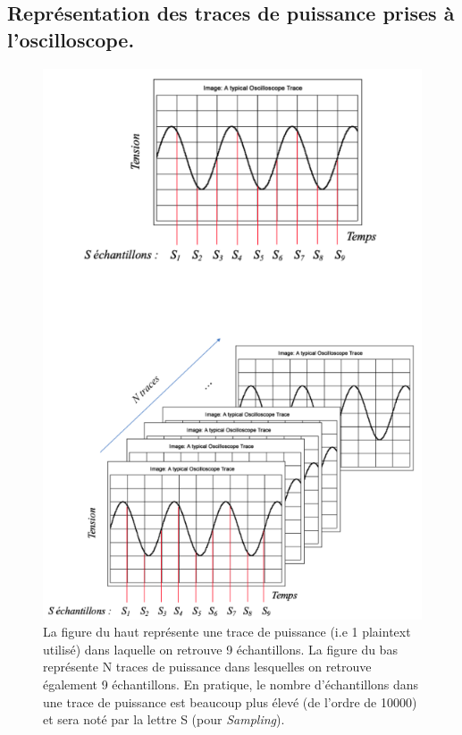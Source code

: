 \documentclass[oneside]{book}
\begin{document}
\begin{appendices}
\newpage

\section{Représentation des traces de puissance prises à l'oscilloscope.}
\label{ann:traceExplain}
\begin{figure}[htbp]
    \centering
    \includegraphics[scale=0.65]{image/Sampling}
    \caption{La figure du haut représente une trace de puissance (i.e 1 plaintext utilisé) dans laquelle on retrouve 9 échantillons. La figure du bas représente N traces de puissance dans lesquelles on retrouve également 9 échantillons. En pratique, le nombre d'échantillons dans une trace de puissance est beaucoup plus élevé (de l'ordre de 10000) et sera noté par la lettre S (pour \textit{Sampling}).}
    \label{fig:traceExplain}
\end{figure}


\end{appendices}
\end{document}
